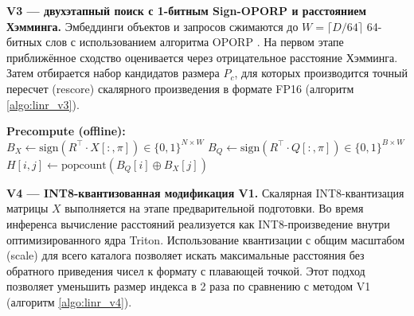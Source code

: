 \documentclass[14pt,a4paper]{extreport}
\numberwithin{figure}{chapter}
\numberwithin{table}{chapter}
\numberwithin{equation}{chapter}
\begin{document}
\begin{algorithm}[htbp]
\caption{LiNR V2 (префильтрация)}
\label{algo:linr_v2}
\end{algorithm}

\textbf{V3 --- двухэтапный поиск с 1-битным Sign-OPORP и расстоянием Хэмминга.}
Эмбеддинги объектов и запросов сжимаются до $W = \lceil D / 64 \rceil$ 64-битных слов с использованием алгоритма OPORP \cite{li2023oporp}. На первом этапе приближённое сходство оценивается через отрицательное расстояние Хэмминга. Затем отбирается набор кандидатов размера $P_c$, для которых производится точный пересчет (rescore) скалярного произведения в формате FP16 (алгоритм \ref{algo:linr_v3}).

\begin{algorithm}[htbp]
\caption{LiNR V3 (1-bit Sign-OPORP и расстояние Хэмминга)}
\label{algo:linr_v3}
\textbf{Precompute (offline):}\\
$B_X \gets \text{sign}( R^\top \cdot X[:, \pi] ) \in \{0,1\}^{N \times W}$\;
$B_Q \gets \text{sign}( R^\top \cdot Q[:, \pi] ) \in \{0,1\}^{B \times W}$\;
$H[i,j] \gets \text{popcount}( B_Q[i] \oplus B_X[j] )$\;
\end{algorithm}

\textbf{V4 --- INT8-квантизованная модификация V1.} Скалярная INT8-квантизация матрицы $X$ выполняется на этапе предварительной подготовки. Во время инференса вычисление расстояний реализуется как INT8-произведение внутри оптимизированного ядра Triton. Использование квантизации с общим масштабом (scale) для всего каталога позволяет искать максимальные расстояния без обратного приведения чисел к формату с плавающей точкой. Этот подход позволяет уменьшить размер индекса в 2 раза по сравнению с методом V1 (алгоритм \ref{algo:linr_v4}).
\end{document}

